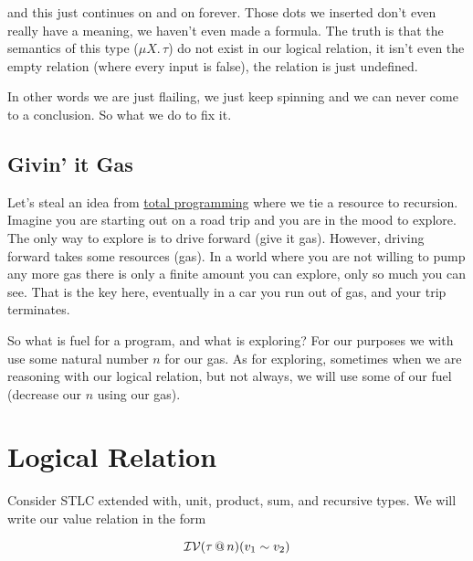 \documentclass{lecturenotes}
\makeatletter
\newcommand{\inval}[4]{\ensuremath{\mathcal{I}\mathcal{V}(#1 \mkern3mu @ \mkern3mu #2)(#3 \sim #4})}
\newcommand{\val}[3]{\ensuremath{\mathcal{V}(#1)(#2 \sim #3)}}
\newcommand{\rectype}[2]{\ensuremath{\mu #1.\,#2}}
\makeatother
\begin{document}
  and this just continues on and on forever. 
  Those dots we inserted don't even really have a meaning, we haven't even made a formula. 
  The truth is that the semantics of this type ($\rectype{X}{\tau}$) do not exist in our logical relation, it isn't even the empty relation (where every input is false), the relation is just undefined. 

In other words we are just flailing, we just keep spinning and we can never come to a conclusion. 
  So what we do to fix it. 

\subsection{Givin' it Gas}

Let's steal an idea from \href{https://en.wikipedia.org/wiki/Total_functional_programming}{total programming} where we tie a resource to recursion. 
  Imagine you are starting out on a road trip and you are in the mood to explore. 
  The only way to explore is to drive forward (give it gas). 
  However, driving forward takes some resources (gas). 
  In a world where you are not willing to pump any more gas there is only a finite amount you can explore, only so much you can see. 
  That is the key here, eventually in a car you run out of gas, and your trip terminates. 

So what is fuel for a program, and what is exploring? 
  For our purposes we with use some natural number $n$ for our gas. 
  As for exploring, sometimes when we are reasoning with our logical relation, but not always, we will use some of our fuel (decrease our $n$ using our gas). 

\section{Logical Relation}

Consider STLC extended with, unit, product, sum, and recursive types.  
  We will write our value relation in the form 

  $$\inval{\tau}{n}{v_1}{v_2}$$
\end{document}
